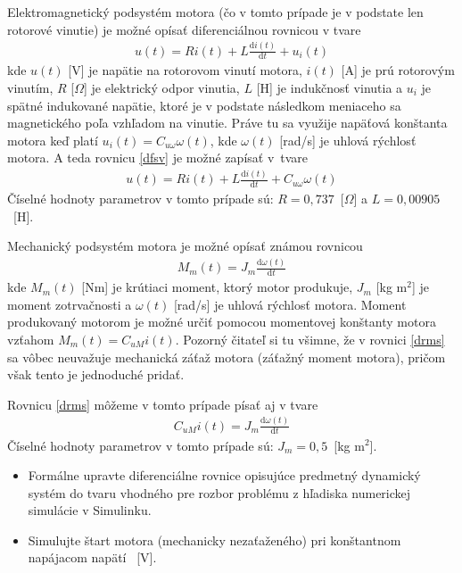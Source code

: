 \documentclass[a4paper, 10pt, ]{article}
\begin{document}
Elektromagnetický podsystém motora (čo v tomto prípade je v podstate len rotorové vinutie) je možné opísať diferenciálnou rovnicou v tvare
\begin{align} \label{dfsv}
	u(t) = R i(t) + L \frac{\text{d}i(t)}{\text{d}t} + u_i(t)
\end{align}
kde $u(t)$ [V] je napätie na rotorovom vinutí motora, $i(t)$ [A] je prú rotorovým vinutím, $R$ [$\Omega$] je elektrický odpor vinutia, $L$ [H] je indukčnosť vinutia a $u_i$ je spätné indukované napätie, ktoré je v podstate následkom meniaceho sa magnetického poľa vzhľadom na vinutie. Práve tu sa využije napäťová konštanta motora keď platí $u_i(t) = C_{u\omega} \omega(t)$, kde $\omega(t)$ [rad/s] je uhlová rýchlosť motora. A teda rovnicu \eqref{dfsv} je možné zapísať v~tvare
\begin{align} \label{dfsv2}
	u(t) = R i(t) + L \frac{\text{d}i(t)}{\text{d}t} + C_{u\omega} \omega(t)
\end{align}
Číselné hodnoty parametrov v tomto prípade sú: $R = 0,737$~[$\Omega$] a $L = 0,00905$~[H].

Mechanický podsystém motora je možné opísať známou rovnicou
\begin{align} \label{drms}
	M_m(t) = J_m \frac{\text{d}\omega(t)}{\text{d}t}
\end{align}
kde $M_m(t)$ [Nm] je krútiaci moment, ktorý motor produkuje, $J_m$ [kg m${}^2$] je moment zotrvačnosti a $\omega(t)$ [rad/s] je uhlová rýchlosť motora. Moment produkovaný motorom je možné určiť pomocou momentovej konštanty motora vzťahom $M_m(t) = C_{uM} i(t)$. Pozorný čitateľ si tu všimne, že v rovnici \eqref{drms} sa vôbec neuvažuje mechanická záťaž motora (záťažný moment motora), pričom však tento je jednoduché pridať.

Rovnicu \eqref{drms} môžeme v tomto prípade písať aj v tvare
\begin{align} \label{drms2}
	C_{uM} i(t) = J_m \frac{\text{d}\omega(t)}{\text{d}t}
\end{align}
Číselné hodnoty parametrov v tomto prípade sú: $J_m = 0,5$~[kg m${}^2$].



\begin{itemize}[leftmargin=0pt, labelsep=3mm, itemsep=0pt]
    \item Formálne upravte diferenciálne rovnice opisujúce predmetný dynamický systém do tvaru vhodného pre rozbor problému z hľadiska numerickej simulácie v Simulinku.
    \item Simulujte štart motora (mechanicky nezaťaženého) pri konštantnom napájacom napätí ~[V].
\end{itemize}
\end{document}
